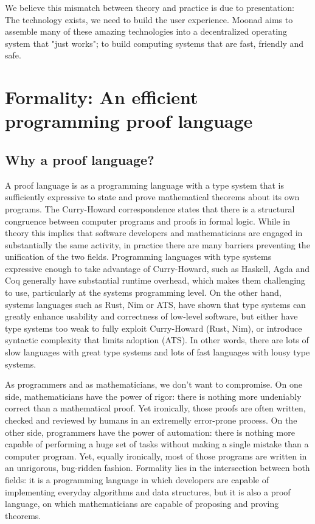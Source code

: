 \documentclass{article}
\theoremstyle{definition}
\theoremstyle{theorem}
\begin{document}
We believe this mismatch between theory and practice is due to presentation: The
technology exists, we need to build the user experience. Moonad aims to assemble
many of these amazing technologies into a decentralized operating system that
"just works"; to build computing systems that are fast, friendly and safe.

\section{Formality: An efficient programming proof language}

\subsection{Why a proof language?}

A proof language is as a programming language with a type system that is
sufficiently expressive to state and prove mathematical theorems about its own
programs. The Curry-Howard correspondence states that there is a structural
congruence between computer programs and proofs in formal logic. While in theory
this implies that software developers and mathematicians are engaged in
substantially the same activity, in practice there are many barriers preventing
the unification of the two fields. Programming languages with type systems
expressive enough to take advantage of Curry-Howard, such as Haskell, Agda and
Coq generally have substantial runtime overhead, which makes them challenging to
use, particularly at the systems programming level. On the other hand, systems
languages such as Rust, Nim or ATS, have shown that type systems can greatly
enhance usability and correctness of low-level software, but either have type
systems too weak to fully exploit Curry-Howard (Rust, Nim), or introduce
syntactic complexity that limits adoption (ATS). In other words, there are lots
of slow languages with great type systems and lots of fast languages with lousy
type systems.

As programmers and as mathematicians, we don't want to compromise. On one side,
mathematicians have the power of rigor: there is nothing more undeniably correct
than a mathematical proof. Yet ironically, those proofs are often written,
checked and reviewed by humans in an extremelly error-prone process. On the
other side, programmers have the power of automation: there is nothing more
capable of performing a huge set of tasks without making a single mistake than a
computer program. Yet, equally ironically, most of those programs are written in
an unrigorous, bug-ridden fashion. Formality lies in the intersection between
both fields: it is a programming language in which developers are capable of
implementing everyday algorithms and data structures, but it is also a proof
language, on which mathematicians are capable of proposing and proving theorems.
\end{document}
